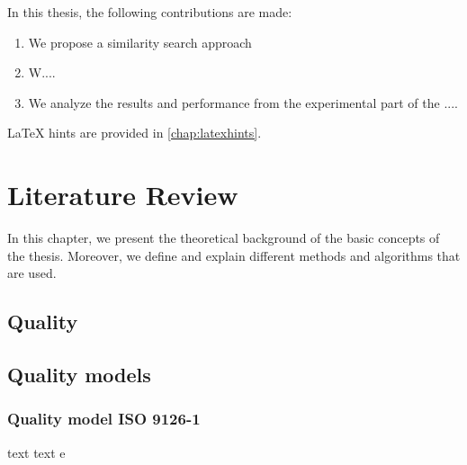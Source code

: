 In this thesis, the following contributions are made:
\begin{enumerate}

\item We propose a similarity search approach 

\item  W....

\item  We analyze the results and performance from the experimental part of the ....

\end{enumerate}











LaTeX hints are provided in \autoref{chap:latexhints}.

\chapter{Literature Review}
In this chapter, we present the theoretical background of the basic concepts of the thesis. Moreover, we define and explain different methods and algorithms that are used. 


\section{Quality}

\section{Quality models}

\subsection{Quality model ISO 9126-1}
text text
e

